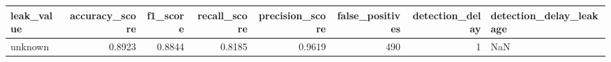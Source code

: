 \begin{tabular}{lrrrrrrl}
\toprule
leak\_value & accuracy\_score & f1\_score & recall\_score & precision\_score & false\_positives & detection\_delay & detection\_delay\_leakage \\
\midrule
unknown & 0.8923 & 0.8844 & 0.8185 & 0.9619 & 490 & 1 & NaN \\
\bottomrule
\end{tabular}
